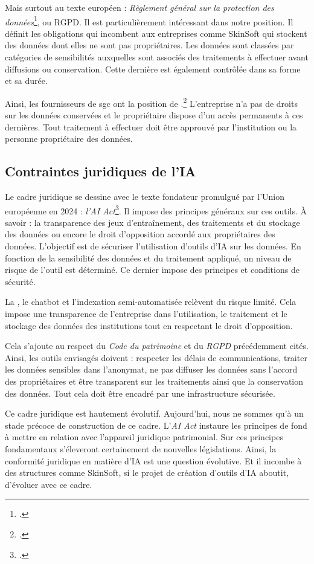 Mais surtout au texte européen : \textit{Règlement général sur la protection des données}\footcite{ReglementGeneralProtection}, ou RGPD. Il est particulièrement intéressant dans notre position. Il définit les obligations qui incombent aux entreprises comme SkinSoft qui stockent des données dont elles ne sont pas propriétaires. Les données sont classées par catégories de sensibilités auxquelles sont associés des traitements à effectuer avant diffusions ou conservation. Cette dernière est également contrôlée dans sa forme et sa durée.

Ainsi, les fournisseurs de \gls{sgc} ont la position de .\footcite[Article 28]{ReglementGeneralProtection} L'entreprise n'a pas de droits sur les données conservées et le propriétaire dispose d'un accès permanents à ces dernières. Tout traitement à effectuer doit être approuvé par l'institution ou la personne propriétaire des données.

\subsection{Contraintes juridiques de l'\gls{IA}}

Le cadre juridique se dessine avec le texte fondateur promulgué par l'Union européenne en 2024 : \textit{l'AI Act}\footcite{LoiEuropeenneLintelligence}. Il impose des principes généraux sur ces outils. À savoir : la transparence des jeux d'entraînement, des traitements et du stockage des données ou encore le droit d'opposition accordé aux propriétaires des données. L'objectif est de sécuriser l'utilisation d'outils d'\gls{IA} sur les données. En fonction de la sensibilité des données et du traitement appliqué, un niveau de risque de l'outil est déterminé. Ce dernier impose des principes et conditions de sécurité.

La , le \gls{chatbot} et l'indexation semi-automatisée relèvent du risque limité. Cela impose une transparence de l'entreprise dans l'utilisation, le traitement et le stockage des données des institutions tout en respectant le droit d'opposition. 

Cela s'ajoute au respect du \textit{Code du patrimoine} et du \textit{RGPD} précédemment cités. Ainsi, les outils envisagés doivent : respecter les délais de communications, traiter les données sensibles dans l'anonymat, ne pas diffuser les données sans l'accord des propriétaires et être transparent sur les traitements ainsi que la conservation des données. Tout cela doit être encadré par une infrastructure sécurisée. \newline

Ce cadre juridique est hautement évolutif. Aujourd'hui, nous ne sommes qu'à un stade précoce de construction de ce cadre. L'\textit{AI Act} instaure les principes de fond à mettre en relation avec l'appareil juridique patrimonial. Sur ces principes fondamentaux s'éleveront certainement de nouvelles législations. Ainsi, la conformité juridique en matière d'\gls{IA} est une question évolutive. Et il incombe à des structures comme SkinSoft, si le projet de création d'outils d'\gls{IA} aboutit, d'évoluer avec ce cadre. 